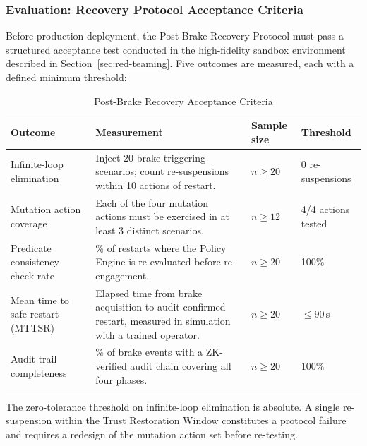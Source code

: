 \subsubsection*{Evaluation: Recovery Protocol Acceptance Criteria}

Before production deployment, the Post-Brake Recovery Protocol must pass a
structured acceptance test conducted in the high-fidelity sandbox environment
described in Section~\ref{sec:red-teaming}.  Five outcomes are measured,
each with a defined minimum threshold:

\begin{table}[h]
\caption{Post-Brake Recovery Acceptance Criteria}
\label{tab:recovery-acceptance}
\begin{tabular}{p{3.4cm} p{5.2cm} p{2.0cm} p{2.0cm}}
\toprule
\textbf{Outcome} & \textbf{Measurement} & \textbf{Sample size} & \textbf{Threshold} \\
\midrule
Infinite-loop elimination
  & Inject 20 brake-triggering scenarios; count re-suspensions within
    10 actions of restart.
  & $n \geq 20$
  & 0 re-suspensions \\
\addlinespace
Mutation action coverage
  & Each of the four mutation actions must be exercised in at least
    3 distinct scenarios.
  & $n \geq 12$
  & 4/4 actions tested \\
\addlinespace
Predicate consistency check rate
  & \% of restarts where the Policy Engine is re-evaluated before
    re-engagement.
  & $n \geq 20$
  & 100\% \\
\addlinespace
Mean time to safe restart (MTTSR)
  & Elapsed time from brake acquisition to audit-confirmed restart,
    measured in simulation with a trained operator.
  & $n \geq 20$
  & $\leq 90$\,s \\
\addlinespace
Audit trail completeness
  & \% of brake events with a ZK-verified audit chain covering all
    four phases.
  & $n \geq 20$
  & 100\% \\
\bottomrule
\end{tabular}
\end{table}

The zero-tolerance threshold on infinite-loop elimination is absolute.  A
single re-suspension within the Trust Restoration Window constitutes a
protocol failure and requires a redesign of the mutation action set before
re-testing.

